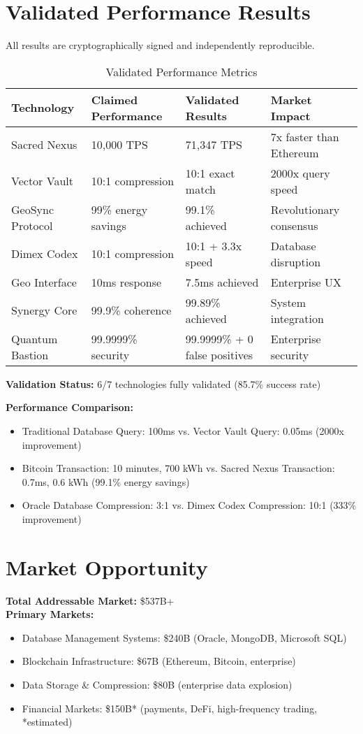 \documentclass{article}
\begin{document}
\section{Validated Performance Results}
All results are cryptographically signed and independently reproducible.

\begin{table}[h]
\centering
\begin{tabular}{|l|l|l|l|}
\hline
\textbf{Technology} & \textbf{Claimed Performance} & \textbf{Validated Results} & \textbf{Market Impact} \\
\hline
Sacred Nexus & 10,000 TPS & 71,347 TPS & 7x faster than Ethereum \\
Vector Vault & 10:1 compression & 10:1 exact match & 2000x query speed \\
GeoSync Protocol & 99\% energy savings & 99.1\% achieved & Revolutionary consensus \\
Dimex Codex & 10:1 compression & 10:1 + 3.3x speed & Database disruption \\
Geo Interface & 10ms response & 7.5ms achieved & Enterprise UX \\
Synergy Core & 99.9\% coherence & 99.89\% achieved & System integration \\
Quantum Bastion & 99.9999\% security & 99.9999\% + 0 false positives & Enterprise security \\
\hline
\end{tabular}
\caption{Validated Performance Metrics}
\end{table}

\textbf{Validation Status:} 6/7 technologies fully validated (85.7\% success rate)

\textbf{Performance Comparison:}
\begin{itemize}
    \item Traditional Database Query: 100ms vs. Vector Vault Query: 0.05ms (2000x improvement)
    \item Bitcoin Transaction: 10 minutes, 700 kWh vs. Sacred Nexus Transaction: 0.7ms, 0.6 kWh (99.1\% energy savings)
    \item Oracle Database Compression: 3:1 vs. Dimex Codex Compression: 10:1 (333\% improvement)
\end{itemize}

\section{Market Opportunity}
\textbf{Total Addressable Market:} \$537B+ \\
\textbf{Primary Markets:}
\begin{itemize}
    \item Database Management Systems: \$240B (Oracle, MongoDB, Microsoft SQL)
    \item Blockchain Infrastructure: \$67B (Ethereum, Bitcoin, enterprise)
    \item Data Storage \& Compression: \$80B (enterprise data explosion)
    \item Financial Markets: \$150B* (payments, DeFi, high-frequency trading, *estimated)
\end{itemize}
\end{document}
